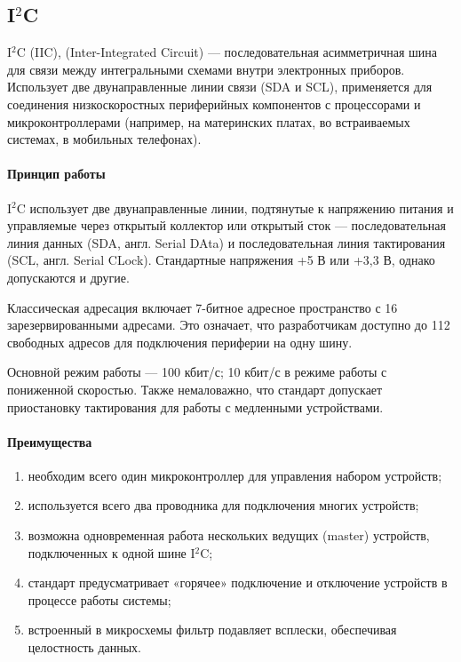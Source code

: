 \documentclass[a4paper,14pt]{extarticle}
\begin{document}
\begin{problem}
	
	\subsection*{I${}^2$C }
	I${}^2$C (IIC), (Inter-Integrated Circuit)  --- последовательная асимметричная шина для связи между интегральными схемами внутри электронных приборов. Использует две двунаправленные линии связи (SDA и SCL), применяется для соединения низкоскоростных периферийных компонентов с процессорами и микроконтроллерами (например, на материнских платах, во встраиваемых системах, в мобильных телефонах).
	
	\paragraph{Принцип работы}
	I${}^2$C использует две двунаправленные линии, подтянутые к напряжению питания и управляемые через открытый коллектор или открытый сток — последовательная линия данных (SDA, англ. Serial DAta) и последовательная линия тактирования (SCL, англ. Serial CLock). Стандартные напряжения +5 В или +3,3 В, однако допускаются и другие.
	
	Классическая адресация включает 7-битное адресное пространство с 16 зарезервированными адресами. Это означает, что разработчикам доступно до 112 свободных адресов для подключения периферии на одну шину.
	
	Основной режим работы — 100 кбит/с; 10 кбит/с в режиме работы с пониженной скоростью. Также немаловажно, что стандарт допускает приостановку тактирования для работы с медленными устройствами.
	
	\paragraph*{Преимущества}
	\begin{enumerate}
		\item необходим всего один микроконтроллер для управления набором устройств;
		\item используется всего два проводника для подключения многих устройств;
		\item возможна одновременная работа нескольких ведущих (master) устройств, подключенных к одной шине I${}^2$C;
		\item стандарт предусматривает «горячее» подключение и отключение устройств в процессе работы системы;
		\item встроенный в микросхемы фильтр подавляет всплески, обеспечивая целостность данных.
	\end{enumerate}
	

\end{problem}
\end{document}
